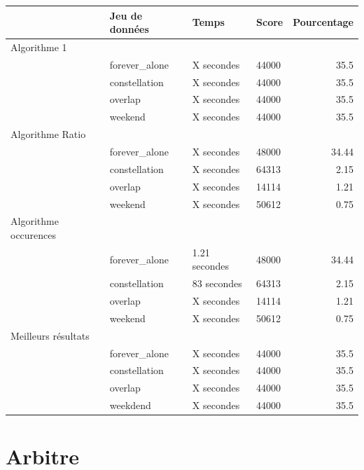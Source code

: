 \documentclass[11pt]{article}
\begin{document}
			\footnotesize
		\hspace*{-1cm}\noindent\begin{tabularx}{16cm}{|l|p{4cm}|X|p{2cm}|r|}
			\hline
			 & \textbf{Jeu de données} & \textbf{Temps} & \textbf{Score} & \textbf{Pourcentage} \\
			\hline
		    \cellcolor{blue!25} Algorithme 1 & & & & \\
		    \cellcolor{blue!25} & forever\_alone & X secondes & 44000 & 35.5 \\
		    \cellcolor{blue!25} & constellation & X secondes & 44000 & 35.5 \\
		    \cellcolor{blue!25} & overlap & X secondes & 44000 & 35.5 \\
		    \cellcolor{blue!25} & weekend & X secondes & 44000 & 35.5 \\
		    \hline
				\cellcolor{yellow!25} Algorithme Ratio & & & & \\
		    \cellcolor{yellow!25} & forever\_alone & X secondes & 48000 & 34.44 \\
		    \cellcolor{yellow!25} & constellation & X secondes & 64313 & 2.15 \\
		    \cellcolor{yellow!25} & overlap & X secondes & 14114 & 1.21 \\
		    \cellcolor{yellow!25} & weekend & X secondes & 50612 & 0.75 \\
				\hline
			\cellcolor{green!25} Algorithme occurences & & & & \\
		    \cellcolor{green!25} & forever\_alone & 1.21 secondes & 48000 & 34.44 \\
		    \cellcolor{green!25} & constellation & 83 secondes & 64313 & 2.15 \\
		    \cellcolor{green!25} & overlap & X secondes & 14114 & 1.21 \\
		    \cellcolor{green!25} & weekend & X secondes & 50612 & 0.75 \\
				\hline
		    \cellcolor{red!25} Meilleurs résultats & & & & \\
		    \cellcolor{red!25} & forever\_alone & X secondes & 44000 & 35.5 \\
		    \cellcolor{red!25} & constellation & X secondes & 44000 & 35.5 \\
		    \cellcolor{red!25} & overlap & X secondes & 44000 & 35.5 \\
		    \cellcolor{red!25} & weekdend & X secondes & 44000 & 35.5 \\
		    \hline
		\end{tabularx}
		\normalsize

	\section{Arbitre} %
	\label{sec:arbitre}
	


	
	

\end{document}
